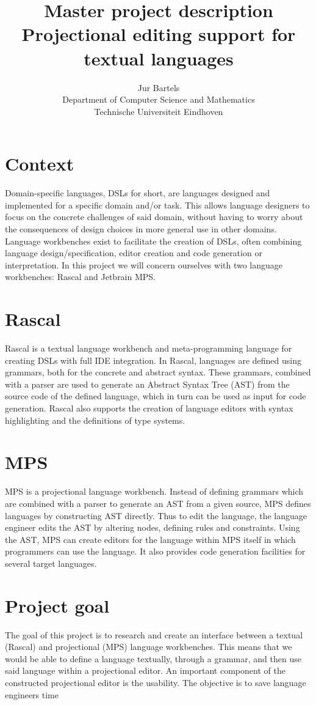 \documentclass[a4paper, 11pt]{article}
\title{\vspace{-2.0cm} Master project description \\ Projectional editing support for textual languages}
\author{Jur Bartels \\ Department of Computer Science and Mathematics\\ Technische Universiteit Eindhoven}
\begin{document}
\maketitle

\section*{Context}
Domain-specific languages, DSLs for short, are languages designed and implemented for a specific domain and/or task. This allows language designers to focus on the concrete challenges of said domain, without having to worry about the consequences of design choices in more general use in other domains. Language workbenches exist to facilitate the creation of DSLs, often combining language design/specification, editor creation and code generation or interpretation. In this project we will concern ourselves with two language workbenches: Rascal and Jetbrain MPS. 

\section*{Rascal}
Rascal is a textual language workbench and meta-programming language for creating DSLs with full IDE integration. In Rascal, languages are defined using grammars, both for the concrete and abstract syntax. These grammars, combined with a parser are used to generate an Abstract Syntax Tree (AST) from the source code of the defined language, which in turn can be used as input for code generation. Rascal also supports the creation of language editors with syntax highlighting and the definitions of type systems.

\section*{MPS}
MPS is a projectional language workbench. Instead of defining grammars which are combined with a parser to generate an AST from a given source, MPS defines languages by constructing AST directly. Thus to edit the language, the language engineer edits the AST by altering nodes, defining rules and constraints. Using the AST, MPS can create editors for the language within MPS itself in which programmers can use the language. It also provides code generation facilities for several target languages.

\section*{Project goal}
The goal of this project is to research and create an interface between a textual (Rascal) and projectional (MPS) language workbenches. This means that we would be able to define a language textually, through a grammar, and then use said language within a projectional editor. An important component of the constructed projectional editor is the usability. The objective is to save language engineers time
\end{document}
